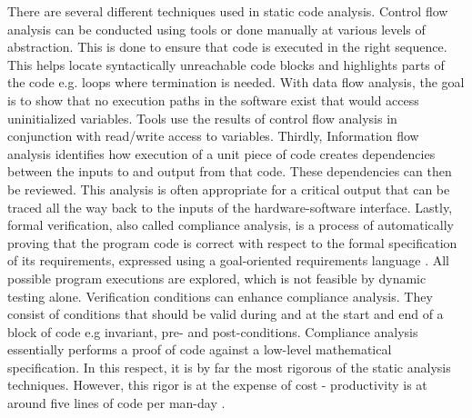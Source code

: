 
There are several different techniques used in static code analysis. Control flow analysis can be conducted using tools or done manually at various levels of abstraction. This is done to ensure that code is executed in the right sequence. This helps locate syntactically unreachable code blocks and highlights parts of the code e.g. loops where termination is needed. With data flow analysis, the goal is to show that no execution paths in the software exist that would access uninitialized variables. Tools use the results of control flow analysis in conjunction with read/write access to variables. Thirdly, Information flow analysis identifies how execution of a unit piece of code creates dependencies between the inputs to and output from that code. These dependencies can then be reviewed. This analysis is often appropriate for a critical output that can be traced all the way back to the inputs of the hardware-software interface. Lastly, formal verification, also called compliance analysis, is a process of automatically proving that the program code is correct with respect to the formal specification of its requirements, expressed using a goal-oriented requirements language \cite{5328605}. All possible program executions are explored, which is not feasible by dynamic testing alone. Verification conditions can enhance compliance analysis. They consist of conditions that should be valid during and at the start and end of a block of code e.g invariant, pre- and post-conditions. Compliance analysis essentially performs a proof of code against a low-level mathematical specification. In this respect, it is by far the most rigorous of the static analysis techniques. However, this rigor is at the expense of cost - productivity is at around five lines of code per man-day \cite{german2003software}.


